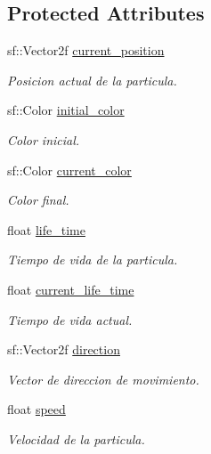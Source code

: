 \subsection*{Protected Attributes}
\begin{DoxyCompactItemize}
\item 
sf\+::\+Vector2f \mbox{\hyperlink{classexample_1_1_particle_acacb393e1b308b469d2e5dc9bdc2011f}{current\+\_\+position}}
\begin{DoxyCompactList}\small\item\em Posicion actual de la particula. \end{DoxyCompactList}\item 
sf\+::\+Color \mbox{\hyperlink{classexample_1_1_particle_a4f6106c9e748261226af7dc27be6fb94}{initial\+\_\+color}}
\begin{DoxyCompactList}\small\item\em Color inicial. \end{DoxyCompactList}\item 
sf\+::\+Color \mbox{\hyperlink{classexample_1_1_particle_a52dbffe5351cd2217c04b844380c6189}{current\+\_\+color}}
\begin{DoxyCompactList}\small\item\em Color final. \end{DoxyCompactList}\item 
float \mbox{\hyperlink{classexample_1_1_particle_a24660b8463f8e71a32c8104059e5d030}{life\+\_\+time}}
\begin{DoxyCompactList}\small\item\em Tiempo de vida de la particula. \end{DoxyCompactList}\item 
float \mbox{\hyperlink{classexample_1_1_particle_acfed6631527b0cc75fc98a10a0fe88fc}{current\+\_\+life\+\_\+time}}
\begin{DoxyCompactList}\small\item\em Tiempo de vida actual. \end{DoxyCompactList}\item 
sf\+::\+Vector2f \mbox{\hyperlink{classexample_1_1_particle_aa6c0d9e3bdeeb79b21d6a7bdadc62a98}{direction}}
\begin{DoxyCompactList}\small\item\em Vector de direccion de movimiento. \end{DoxyCompactList}\item 
float \mbox{\hyperlink{classexample_1_1_particle_a736704d02529ef3e2e4dc4f91c928cd4}{speed}}
\begin{DoxyCompactList}\small\item\em Velocidad de la particula. \end{DoxyCompactList}\end{DoxyCompactItemize}


